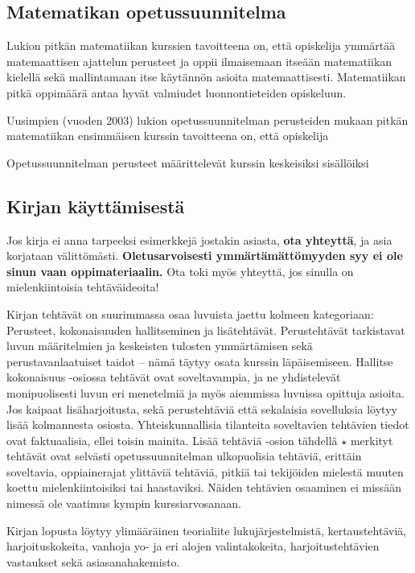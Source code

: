 \subsection*{Matematikan opetussuunnitelma}

Lukion pitkän matematiikan kurssien tavoitteena on, että opiskelija ymmärtää matemaattisen ajattelun perusteet ja oppii ilmaisemaan itseään matematiikan kielellä sekä mallintamaan itse käytännön asioita matemaattisesti. Matematiikan pitkä oppimäärä antaa hyvät valmiudet luonnontieteiden opiskeluun.

Uusimpien (vuoden 2003) lukion opetussuunnitelman perusteiden mukaan pitkän matematiikan ensimmäisen kurssin tavoitteena on, että opiskelija

Opetussuunnitelman perusteet määrittelevät kurssin keskeisiksi sisällöiksi


\newpage

\subsection*{Kirjan käyttämisestä}

Jos kirja ei anna tarpeeksi esimerkkejä jostakin asiasta, \textbf{ota yhteyttä}, ja asia korjataan välittömästi. \textbf{Oletusarvoisesti ymmärtämättömyyden syy ei ole sinun vaan oppimateriaalin.} Ota toki myös yhteyttä, jos sinulla on mielenkiintoisia tehtäväideoita!

Kirjan tehtävät on suurimmassa osaa luvuista jaettu kolmeen kategoriaan: Perusteet, kokonaisuuden hallitseminen ja lisätehtävät. Perustehtävät tarkistavat luvun määritelmien ja keskeisten tulosten ymmärtämisen sekä perustavanlaatuiset taidot -- nämä täytyy osata kurssin läpäisemiseen. Hallitse kokonaisuus -osiossa tehtävät ovat soveltavampia, ja ne yhdistelevät monipuolisesti luvun eri menetelmiä ja myös aiemmissa luvuissa opittuja asioita. Jos kaipaat lisäharjoitusta, sekä perustehtäviä että sekalaisia sovelluksia löytyy lisää kolmannesta osiosta. Yhteiskunnallisia tilanteita soveltavien tehtävien tiedot ovat faktuaalisia, ellei toisin mainita. Lisää tehtäviä -osion tähdellä $\star$ merkityt tehtävät ovat selvästi opetussuunnitelman ulkopuolisia tehtäviä, erittäin soveltavia, oppiainerajat ylittäviä tehtäviä, pitkiä tai tekijöiden mielestä muuten koettu mielenkiintoisiksi tai haastaviksi. Näiden tehtävien osaaminen ei missään nimessä ole vaatimus kympin kurssiarvosanaan.

Kirjan lopusta löytyy ylimääräinen teorialiite lukujärjestelmistä, kertaustehtäviä, harjoituskokeita, vanhoja yo- ja eri alojen valintakokeita, harjoitustehtävien vastaukset sekä asiasanahakemisto.

\newpage
